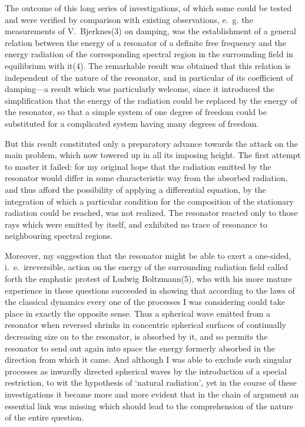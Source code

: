 \documentclass[12pt,oneside]{book}
\begin{document}
The outcome of this long series of investigations, of
which some could be tested and were verified by comparison
with existing observations, e.~g. the measurements of
V.~Bjerknes(3) on damping, was the establishment of
a general relation between the energy of a resonator of
a definite free frequency and the energy radiation
of the corresponding spectral region in the surrounding
field in equilibrium with it(4). The remarkable result was
obtained that this relation is independent of the
nature of the resonator, and in particular of its coefficient
of damping---a result which was particularly welcome,
since it introduced the simplification that the energy of the
radiation could be replaced by the energy of the resonator,
so that a simple system of one degree of freedom could be
substituted for a complicated system having many degrees
of freedom.

But this result constituted only a preparatory advance
towards the attack on the main problem, which now
towered up in all its imposing height. The first attempt to
master it failed: for my original hope that the radiation
emitted by the resonator would differ in some characteristic
way from the absorbed radiation, and thus afford the
possibility of applying a differential equation, by the integration
of which a particular condition for the composition of
the stationary radiation could be reached, was not realized.
The resonator reacted only to those rays which were emitted
by itself, and exhibited no trace of resonance to neighbouring
spectral regions.

Moreover, my suggestion that the resonator might be
able to exert a one-sided, i.~e.~irreversible, action on the
energy of the surrounding radiation field called forth the
emphatic protest of Ludwig Boltzmann(5),
who with his more mature experience in these questions succeeded in
showing that according to the laws of the classical
dynamics every one of the processes I was considering
could take place in exactly the opposite sense. Thus
a spherical wave emitted from a resonator when reversed
shrinks in concentric spherical surfaces of continually decreasing
size on to the resonator, is absorbed by it, and so
permits the resonator to send out again into space the
energy formerly absorbed in the direction from which it
came. And although I was able to exclude such singular
processes as inwardly directed spherical waves by the
introduction of a special restriction, to wit the hypothesis
of `natural radiation', yet in the course of these investigations
it became more and more evident that in the chain
of argument an essential link was missing which should
lead to the comprehension of the nature of the entire
question.
\end{document}
